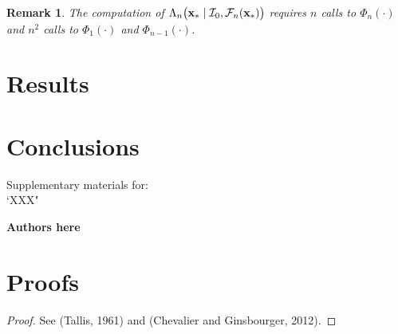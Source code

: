 \documentclass{article} %
\newcommand{\I}{\mathcal{I}}
\newcommand{\ud}{\mathrm{d}}
\newcommand{\N}{\mathcal{N}}
\newcommand{\future}{\mathcal{F}}
\newcommand{\IR}{\mathbb{R}}
\newtheorem{proof}{Proof}
\newtheorem{remark}{Remark}
\begin{document}
\begin{remark}
The computation of $\Lambda_n \bigl(\latentVector_* \mid \I_0, \future_{n}(\latentVector_*) \bigr)$ requires $n$ calls to $\Phi_n(\cdot)$ and $n^2$ calls to  $\Phi_1(\cdot)$ and  $\Phi_{n-1}(\cdot)$.
\end{remark}



\section{Results}


\section{Conclusions}




\clearpage
\setcounter{section}{0}
\setcounter{equation}{0}
\renewcommand{\thesection}{S\arabic{section}}
\renewcommand{\theequation}{S.\arabic{equation}}

\begin{center}
{\LARGE  Supplementary materials for:\\
`XXX"}
\end{center}
\begin{center}
\textbf{Authors here}
\end{center}

\section{Proofs}

\begin{proof}
See (Tallis, 1961) and (Chevalier and Ginsbourger, 2012).
\end{proof}
\end{document}
